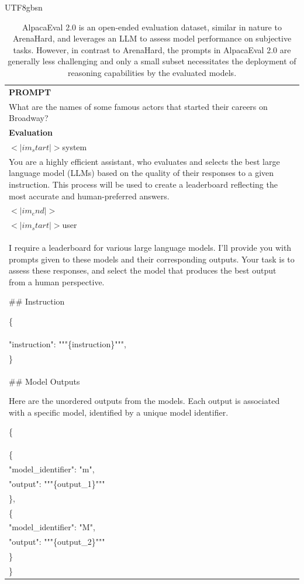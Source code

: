 \documentclass[11pt, a4paper, logo, copyright, nonumbering]{deepseek}
\begin{document}
\begin{CJK*}{UTF8}{gbsn}
\begin{table}[h]
    \centering \small
        \caption{AlpacaEval 2.0 is an open-ended evaluation dataset, similar in nature to ArenaHard, and leverages an LLM to assess model performance on subjective tasks. However, in contrast to ArenaHard, the prompts in AlpacaEval 2.0 are generally less challenging and only a small subset necessitates the deployment of reasoning capabilities by the evaluated models. }
    \label{tab:alpacaeval_eval_format_example}
    \begin{tabular}{p{}}
    \hline
    \textbf{PROMPT}\\
    What are the names of some famous actors that started their careers on Broadway?
    \\ \hline
      \textbf{Evaluation}\\
      $<|im_start|>$system \\
You are a highly efficient assistant, who evaluates and selects the best large language model (LLMs) based on the quality of their responses to a given instruction. This process will be used to create a leaderboard reflecting the most accurate and human-preferred answers.\\
$<|im_end|>$\\
$<|im_start|>$user\\
I require a leaderboard for various large language models. I'll provide you with prompts given to these models and their corresponding outputs. Your task is to assess these responses, and select the model that produces the best output from a human perspective.

\#\# Instruction

\{\\
    "instruction": """\{instruction\}""",\\
\}\\

\#\# Model Outputs

Here are the unordered outputs from the models. Each output is associated with a specific model, identified by a unique model identifier.

\{\\
    \{\\
        "model\_identifier": "m",\\
        "output": """\{output\_1\}"""\\
    \},\\
    \{\\
        "model\_identifier": "M",\\
        "output": """\{output\_2\}"""\\
    \}\\
\}


\end{tabular}
\end{table}
\end{CJK*}
\end{document}
